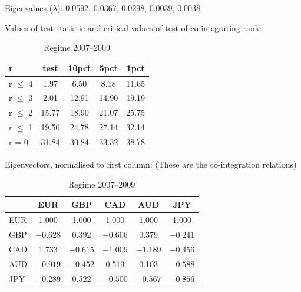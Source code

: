 	\begin{table}[!ht]
	\caption{Regime 2007--2009 \label{tab:fulldur2}}
	\centering
	Eigenvalues ($\lambda$): 0.0592, 0.0367, 0.0298, 0.0039, 0.0038

	Values of test statistic and critical values of test of co-integrating rank: \\[0.1cm]
	
	\begin{tabular}{| l | c | c | c | c |} \hline
	r               &  test & 10pct & 5pct & 1pct\\ \hline
	r $\leq$ 4 &  1.97  & 6.50 &  8.18 & 11.65\\ \hline
	r $\leq$ 3 &  2.01 & 12.91 & 14.90 & 19.19\\ \hline
	r $\leq$ 2 & 15.77 & 18.90 & 21.07 & 25.75\\ \hline
	r $\leq$ 1 & 19.50 & 24.78 & 27.14 & 32.14\\ \hline
	r = 0  & 31.84 & 30.84 & 33.32 & 38.78
	\end{tabular}

	Eigenvectors, normalised to first column: (These are the co-integration relations) \\[0.1cm]
	
	\begin{tabular}{| l | c | c | c | c | c |} \hline
	         &  EUR  &   GBP  &   CAD   &  AUD  &   JPY \\ \hline
	EUR & 1.000 & 1.000 & 1.000 & 1.000 & 1.000 \\ \hline
	GBP & $-0.628$ & 0.392 & $-0.606$ & 0.379 & $-0.241$ \\ \hline
	CAD & 1.733 & $-0.615$ & $-1.009$ & $-1.189$ & $-0.456$ \\ \hline
	AUD & $-0.919$ & $-0.452$  & 0.519  & 0.103 & $-0.588$ \\ \hline
	JPY & $-0.289$  & 0.522 & $-0.500$ & $-0.567$ & $-0.856$
	\end{tabular}
	\end{table}

